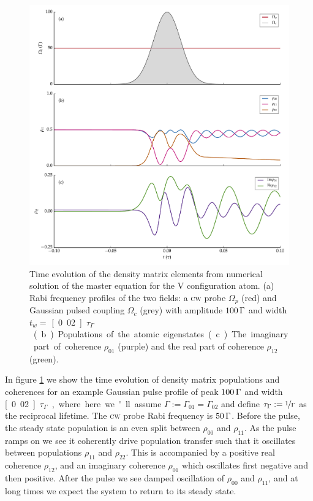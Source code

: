     \begin{figure}
    \includegraphics[width=\linewidth]{figs/06_simultons/ob_vee_solve_pls_t002_50c_100p_fig1.pdf}
    \caption{
    Time evolution of the density matrix elements from numerical solution of the
    master equation for the V configuration atom.  (a) Rabi frequency profiles
    of the two fields: a \textsc{cw} probe $\Omega_p$ (red) and Gaussian pulsed
    coupling $\Omega_c$ (grey) with amplitude $\unit[100]\Gamma$ and width $t_w
    = $ \unit[0.02]{$\tau_\Gamma$}. (b) Populations of the atomic eigenstates.
    (c) The imaginary part of coherence $\rho_{01}$ (purple) and the real part
    of coherence $\rho_{12}$ (green).
    }
    \label{fig:ob_vee_plse}
    \end{figure}

    In figure \ref{fig:ob_vee_plse} we show the time evolution of density matrix
    populations and coherences for an example Gaussian pulse profile of peak
    $\unit[100]\Gamma$ and width \unit[0.02]{$\tau_\Gamma$}, where here we'll
    assume $\Gamma := \Gamma_{01} = \Gamma_{02}$ and define $\tau_\Gamma :=
    \nicefrac{1}{\Gamma}$ as the reciprocal lifetime. The \textsc{cw} probe Rabi
    frequency is $\unit[50]\Gamma$. Before the pulse, the steady state
    population is an even split between $\rho_{00}$ and $\rho_{11}$. As the
    pulse ramps on we see it coherently drive population transfer such that it
    oscillates between populations $\rho_{11}$ and $\rho_{22}$. This is
    accompanied by a positive real coherence $\rho_{12}$, and an imaginary
    coherence $\rho_{01}$ which oscillates first negative and then positive.
    After the pulse we see damped oscillation of $\rho_{00}$ and $\rho_{11}$,
    and at long times we expect the system to return to its steady state.

